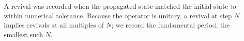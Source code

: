 A revival was recorded when the propagated state matched the initial
state to within numerical tolerance. Because the operator is unitary,
a revival at step $N$ implies revivals at all multiples of $N$; we
record the fundamental period, the smallest such $N$.
